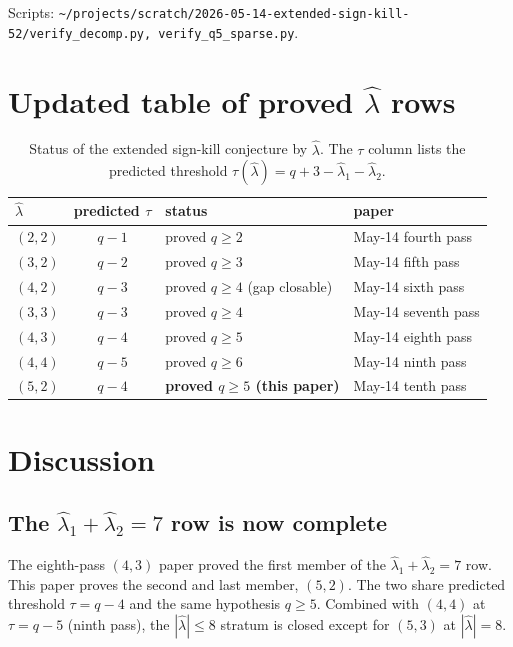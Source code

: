 \documentclass[11pt]{article}
\theoremstyle{definition}
\newcommand{\hatl}{\widehat\lambda}
\begin{document}
Scripts:
\texttt{\textasciitilde/projects/scratch/2026-05-14-extended-sign-kill-52/verify\_decomp.py,
verify\_q5\_sparse.py}.

\section{Updated table of proved $\hatl$ rows}\label{sec:table}

\begin{table}[h]
\centering
\renewcommand{\arraystretch}{1.15}
\caption{Status of the extended sign-kill conjecture by $\hatl$.  The
$\tau$ column lists the predicted threshold $\tau(\hatl) = q + 3 -
\hatl_1 - \hatl_2$.}
\begin{tabular}{l|c|l|l}
\toprule
$\hatl$ & predicted $\tau$ & status & paper \\
\midrule
$(2, 2)$ & $q - 1$ & proved $q \ge 2$           & May-14 fourth pass \\
$(3, 2)$ & $q - 2$ & proved $q \ge 3$           & May-14 fifth pass \\
$(4, 2)$ & $q - 3$ & proved $q \ge 4$ (gap closable) & May-14 sixth pass \\
$(3, 3)$ & $q - 3$ & proved $q \ge 4$           & May-14 seventh pass \\
$(4, 3)$ & $q - 4$ & proved $q \ge 5$            & May-14 eighth pass \\
$(4, 4)$ & $q - 5$ & proved $q \ge 6$            & May-14 ninth pass \\
$(5, 2)$ & $q - 4$ & \textbf{proved $q \ge 5$ (this paper)} & May-14 tenth pass \\
\bottomrule
\end{tabular}
\end{table}

\section{Discussion}\label{sec:discussion}

\subsection{The $\hatl_1 + \hatl_2 = 7$ row is now complete}

The eighth-pass $(4, 3)$ paper proved the first member of the
$\hatl_1 + \hatl_2 = 7$ row.  This paper proves the second and last
member, $(5, 2)$.  The two share predicted threshold $\tau = q - 4$
and the same hypothesis $q \ge 5$.  Combined with $(4, 4)$ at
$\tau = q - 5$ (ninth pass), the $|\hatl| \le 8$ stratum is closed
except for $(5, 3)$ at $|\hatl| = 8$.
\end{document}
